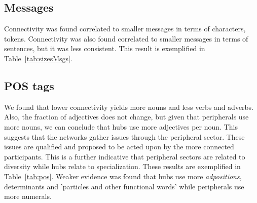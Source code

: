 \subsection{Messages}\label{subsec:mm}

Connectivity was found correlated to smaller messages in terms of characters, tokens.
Connectivity was also found correlated to smaller messages in terms of sentences, but
it was less consistent.
This result is exemplified in Table~\ref{tab:sizesMsgs}.



\subsection{POS tags}\label{subsec:pos}

We found that lower connectivity yields more nouns and less verbs and adverbs.
Also, the fraction of adjectives does not change,
but given that peripherals use more nouns,
we can conclude that hubs use more adjectives per noun.
This suggests that the networks gather issues
through the peripheral sector. 
These issues are qualified and proposed to be acted upon
by the more connected participants.
This is a further indicative that peripheral sectors
are related to diversity while hubs relate to specialization.
These results are exemplified in Table~\ref{tab:pos}.
Weaker evidence was found that hubs use more \emph{adpositions},
determinants and 'particles and other functional words' while
peripherals use more numerals.


